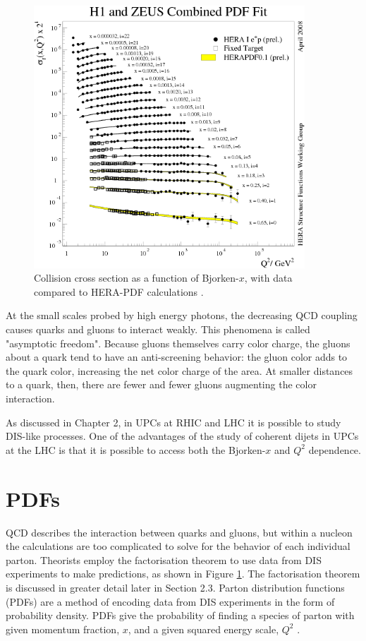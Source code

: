 \begin{figure}[h!]
\begin{centering}
\includegraphics[width=4in]{Chapter1/importfigs/scholarpedia_bjorken_x_qcdExp.png}
\par\end{centering}
\caption{Collision cross section as a function of Bjorken-$x$, with data compared to HERA-PDF calculations \cite{Shimizu:2009fc}. \label{fig:qcdBjorkenX}}
\end{figure}

At the small scales probed by high energy photons, the decreasing QCD coupling causes quarks and gluons to interact weakly. This phenomena is called "asymptotic freedom". Because gluons themselves carry color charge, the gluons about a quark tend to have an anti-screening behavior: the gluon color adds to the quark color, increasing the net color charge of the area. At smaller distances to a quark, then, there are fewer and fewer gluons augmenting the color interaction.

As discussed in Chapter 2, in UPCs at RHIC and LHC it is possible to study DIS-like processes. One of the advantages of the study of coherent dijets in UPCs at the LHC is that it is possible to access both the Bjorken-$x$ and $Q^2$ dependence.

\section{PDFs}

QCD describes the interaction between quarks and gluons, but within a nucleon the calculations are too complicated to solve for the behavior of each individual parton. Theorists employ the factorisation theorem to use data from DIS experiments to make predictions, as shown in Figure \ref{fig:qcdBjorkenX}. The factorisation theorem is discussed in greater detail later in Section 2.3. Parton distribution functions (PDFs) are a method of encoding data from DIS experiments in the form of probability density. PDFs give the probability of finding a species of parton with given momentum fraction, $x$, and a given squared energy scale, $Q^2$ \cite{Martin:2009iq,Eskola:2008ca,Pumplin:2002vw,cmsJpPP}.

